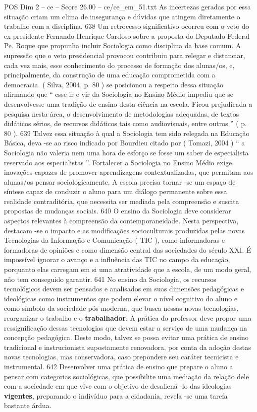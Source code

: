 \begin{textsample}{POS Dim 2 – ce – Score 26.00 – ce/ce\_em\_51.txt}
As incertezas geradas por essa situação criam um clima de insegurança e dúvidas que atingem diretamente o trabalho com a disciplina. 638 Um retrocesso significativo ocorreu com o veto do ex-presidente Fernando Henrique Cardoso sobre a proposta do Deputado Federal Pe.
Roque que propunha incluir Sociologia como disciplina da base comum.
A supressão que o veto presidencial provocou contribuiu para relegar e distanciar, cada vez mais, esse conhecimento do processo de formação dos alunas/os, e, principalmente, da construção de uma educação comprometida com a democracia. ( Silva, 2004, p. 80 ) se posicionou a respeito dessa situação afirmando que “ esse ir e vir da Sociologia no Ensino Médio impediu que se desenvolvesse uma tradição de ensino desta ciência na escola.
Ficou prejudicada a pesquisa nesta área, o desenvolvimento de metodologias adequadas, de textos didáticos sérios, de recursos didáticos tais como audiovisuais, entre outros ” ( p. 80 ). 639 Talvez essa situação à qual a Sociologia tem sido relegada na Educação Básica, deva -se ao risco indicado por Bourdieu citado por ( Tomazi, 2004 ) “ a Sociologia não valeria nem uma hora de esforço se fosse um saber de especialista reservado aos especialistas ”.
Fortalecer a Sociologia no Ensino Médio exige inovações capazes de promover aprendizagens contextualizadas, que permitam aos alunas/os pensar sociologicamente.
A escola precisa tornar -se um espaço de síntese capaz de conduzir o aluno para um diálogo permanente sobre essa realidade contraditória, que necessita ser mediada pela compreensão e suscita propostas de mudanças sociais. 640 O ensino da Sociologia deve considerar aspectos relevantes à compreensão da contemporaneidade.
Nesta perspectiva, destacam -se o impacto e as modificações socioculturais produzidas pelas novas Tecnologias da Informação e Comunicação ( TIC ), como informadoras e formadoras de opiniões e como dimensão central das sociedades do século XXI.
É impossível ignorar o avanço e a influência das TIC no campo da educação, porquanto elas carregam em si uma atratividade que a escola, de um modo geral, não tem conseguido garantir. 641 No ensino da Sociologia, os recursos tecnológicos devem ser pensados e analisados em suas dimensões pedagógicas e ideológicas como instrumentos que podem elevar o nível cognitivo do aluno e como símbolo da sociedade pós-moderna, que busca nessas novas tecnologias, reorganizar o trabalho e o \textbf{trabalhador}.
A prática do professor deve propor uma ressignificação dessas tecnologias que devem estar a serviço de uma mudança na concepção pedagógica.
Deste modo, talvez se possa evitar uma prática de ensino tradicional e instrucionista supostamente renovadora, por conta da adoção destas novas tecnologias, mas conservadora, caso prepondere seu caráter tecnicista e instrumental. 642 Desenvolver uma prática de ensino que prepare o aluno a pensar com categorias sociológicas, que possibilite uma mediação da relação dele com a sociedade em que vive com o objetivo de desaliená -lo das ideologias \textbf{vigentes}, preparando o indivíduo para a cidadania, revela -se uma tarefa bastante árdua.

\end{textsample}
